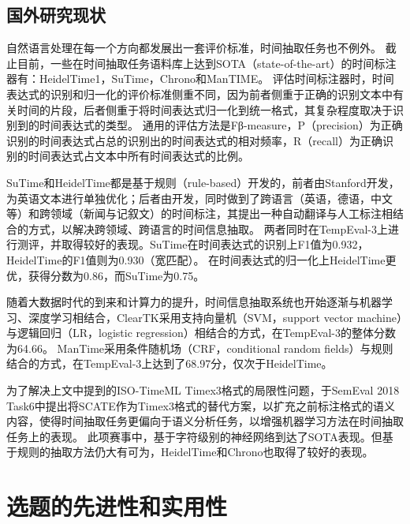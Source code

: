 \subsection{国外研究现状}

自然语言处理在每一个方向都发展出一套评价标准，时间抽取任务也不例外。
截止目前，一些在时间抽取任务语料库上达到SOTA（state-of-the-art）的时间标注器有：HeidelTime1\cite{strotgen2010heideltime}，SuTime\cite{chang2012sutime}，Chrono\cite{olex2018chrono}和ManTIME\cite{filannino2013mantime}。
评估时间标注器时，时间表达式的识别和归一化的评价标准侧重不同，因为前者侧重于正确的识别文本中有关时间的片段，后者侧重于将时间表达式归一化到统一格式，其复杂程度取决于识别到的时间表达式的类型。
通用的评估方法是Fβ-measure，P（precision）为正确识别的时间表达式占总的识别出的时间表达式的相对频率，R（recall）为正确识别的时间表达式占文本中所有时间表达式的比例。

SuTime和HeidelTime都是基于规则（rule-based）开发的，前者由Stanford开发，为英语文本进行单独优化；后者由\citet{strotgen2010heideltime}开发，同时做到了跨语言（英语，德语，中文等）和跨领域（新闻与记叙文）的时间标注，其提出一种自动翻译与人工标注相结合的方式，以解决跨领域、跨语言的时间信息抽取。
两者同时在TempEval-3上进行测评，并取得较好的表现。SuTime在时间表达式的识别上F1值为0.932，HeidelTime的F1值则为0.930（宽匹配）。
在时间表达式的归一化上HeidelTime更优，获得分数为0.86，而SuTime为0.75。

随着大数据时代的到来和计算力的提升，时间信息抽取系统也开始逐渐与机器学习、深度学习相结合，ClearTK\cite{bethard2013cleartk}采用支持向量机（SVM，support vector machine）与逻辑回归（LR，logistic regression）相结合的方式，在TempEval-3的整体分数为64.66。
ManTime\cite{filannino2013mantime}采用条件随机场（CRF，conditional random fields）与规则结合的方式，在TempEval-3上达到了68.97分，仅次于HeidelTime。

为了解决上文中提到的ISO-TimeML Timex3格式的局限性问题，\citet{laparra2018characters}于SemEval 2018 Task6中提出将SCATE作为Timex3格式的替代方案，以扩充之前标注格式的语义内容，使得时间抽取任务更偏向于语义分析任务，以增强机器学习方法在时间抽取任务上的表现。
此项赛事中，\citet{laparra2018characters}基于字符级别的神经网络到达了SOTA表现。但基于规则的抽取方法仍大有可为，HeidelTime和Chrono也取得了较好的表现。

\section{选题的先进性和实用性}

